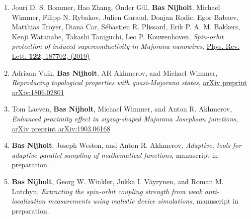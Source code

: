 \begin{enumerate}
\item Jouri D. S. Bommer, Hao Zhang, {\"O}nder G{\"u}l, \textbf{Bas Nijholt}, Michael Wimmer, Filipp N. Rybakov, Julien Garaud, Donjan Rodic, Egor Babaev, Matthias Troyer, Diana Car, S{\'e}bastien R. Plissard, Erik P. A. M. Bakkers, Kenji Watanabe, Takashi Taniguchi, Leo P. Kouwenhoven, \textit{Spin-orbit protection of induced superconductivity in Majorana nanowires}, \href{https://doi.org/10.1103/PhysRevLett.122.187702}{Phys. Rev. Lett. \textbf{122}, 187702, (2019)}

\item Adriaan Vuik, \textbf{Bas Nijholt}, AR Akhmerov, and Michael Wimmer, \textit{Reproducing topological properties with quasi-Majorana states}, \href{https://arxiv.org/abs/1806.02801}{arXiv preprint arXiv:1806.02801}

\item Tom Laeven, \textbf{Bas Nijholt}, Michael Wimmer, and Anton R. Akhmerov, \textit{Enhanced proximity effect in zigzag-shaped Majorana Josephson junctions}, \href{https://arxiv.org/abs/1903.06168}{arXiv preprint arXiv:1903.06168}

\item \textbf{Bas Nijholt}, Joseph Weston, and Anton R. Akhmerov, \textit{Adaptive, tools for adaptive parallel sampling of mathematical functions}, manuscript in preparation.

\item \textbf{Bas Nijholt}, Georg W. Winkler, Jukka I. V{\"a}yrynen, and Roman M. Lutchyn, \textit{Extracting the spin-orbit coupling strength from weak anti-localization measurements using realistic device simulations}, manuscript in preparation.

\end{enumerate}

